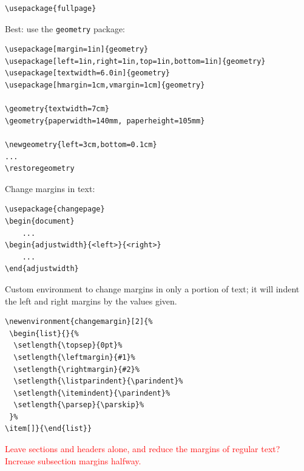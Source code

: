 \documentclass{article}
\begin{document}
\begin{lstlisting}
\usepackage{fullpage}
\end{lstlisting}

Best: use the \verb|geometry| package:
\begin{lstlisting}
\usepackage[margin=1in]{geometry}
\usepackage[left=1in,right=1in,top=1in,bottom=1in]{geometry}
\usepackage[textwidth=6.0in]{geometry}
\usepackage[hmargin=1cm,vmargin=1cm]{geometry}

\geometry{textwidth=7cm}
\geometry{paperwidth=140mm, paperheight=105mm}

\newgeometry{left=3cm,bottom=0.1cm}
...
\restoregeometry
\end{lstlisting}


Change margins in text:
\begin{lstlisting}
\usepackage{changepage}
\begin{document}
    ...
\begin{adjustwidth}{<left>}{<right>}
    ...
\end{adjustwidth}
\end{lstlisting}

Custom environment to change margins in only a portion of text;
it will indent the left and right margins by the values given.
\begin{lstlisting}
\newenvironment{changemargin}[2]{%
 \begin{list}{}{%
  \setlength{\topsep}{0pt}%
  \setlength{\leftmargin}{#1}%
  \setlength{\rightmargin}{#2}%
  \setlength{\listparindent}{\parindent}%
  \setlength{\itemindent}{\parindent}%
  \setlength{\parsep}{\parskip}%
 }%
\item[]}{\end{list}}
\end{lstlisting}

\textcolor{red}{Leave sections and headers alone, and reduce the margins of
regular text? Increase subsection margins halfway.}
\end{document}
